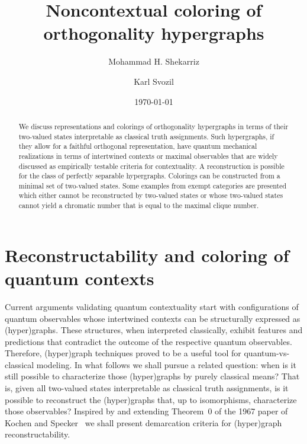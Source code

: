 \documentclass[%
12pt,
prereprint,
showpacs,
showkeys,
preprintnumbers,
amsmath,amssymb,
aps,
pra,
longbibliography,
notitlepage
]{revtex4-1}
\theoremstyle{definition}
\begin{document}
	
	\title{Noncontextual coloring of orthogonality hypergraphs}
	
	
	
	\author{Mohammad H. Shekarriz}
	
	\author{Karl Svozil}
	
	
	
	\date{\today}
	
	\begin{abstract}
		We discuss representations and colorings of orthogonality hypergraphs in terms of their two-valued states interpretable as classical truth assignments. Such hypergraphs, if they allow for a faithful orthogonal representation, have quantum mechanical realizations in terms of intertwined contexts or maximal observables that are widely discussed as empirically testable criteria for contextuality. A reconstruction is possible for the class of perfectly separable hypergraphs. Colorings can be constructed from a minimal set of two-valued states. Some examples from exempt categories are presented which either cannot be reconstructed by two-valued states or whose two-valued states cannot yield a chromatic number that is equal to the maximal clique number.
	\end{abstract}
	
	
	\maketitle
	
	
	\section{Reconstructability and coloring of quantum contexts}
	
	Current arguments validating quantum contextuality start with configurations of quantum observables whose intertwined contexts can be structurally expressed as (hyper)graphs. These structures, when interpreted classically, exhibit features and predictions that contradict the outcome of the respective quantum observables. Therefore, (hyper)graph techniques proved to be a useful tool for quantum-vs-classical modeling.
	In what follows we shall pursue a related question: when is it still possible to characterize those (hyper)graphs by purely classical means? That is, given all two-valued states interpretable as classical truth assignments, is it possible to reconstruct the (hyper)graphs that, up to isomorphisms, characterize those observables?
	Inspired by and extending Theorem~0 of the 1967 paper of Kochen and Specker~\cite{kochen1} we shall present demarcation criteria for (hyper)graph reconstructability.
	
\end{document}
